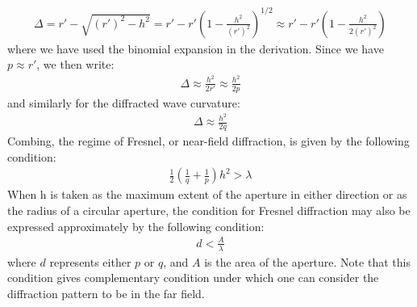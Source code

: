 \documentclass[11pt]{book}
\theoremstyle{break}
\theoremstyle{break}
\begin{document}
\begin{align*}
\Delta = r' - \sqrt{(r')^2 - h^2} = r' - r'\left( 1- \frac{h^2}{(r')^2}\right)^{1/2} \approx r' - r'\left( 1-\frac{h^2}{2(r')^2}\right)
\end{align*}
where we have used the binomial expansion in the derivation. Since we have $p\approx r'$, we then write:
\begin{align*}
\Delta \approx \frac{h^2}{2r'} \approx \frac{h^2}{2p}
\end{align*}
and similarly for the diffracted wave curvature:
\begin{align*}
\Delta \approx \frac{h^2}{2q}
\end{align*}
Combing, the regime of Fresnel, or near-field diffraction, is given by the following condition:
\begin{align*}
\frac{1}{2}\left( \frac{1}{q}+\frac{1}{p}\right)h^2 > \lambda
\end{align*}
When h is taken as the maximum extent of the aperture in either direction or as the radius of a circular aperture, the condition for Fresnel diffraction may also be expressed approximately by the following condition:
\begin{align*}
d< \frac{A}{\lambda}
\end{align*}
where $d$ represents either $p$ or $q$, and $A$ is the area of the aperture. Note that this condition gives complementary condition under which one can consider the diffraction pattern to be in the far field.\\
\end{document}
